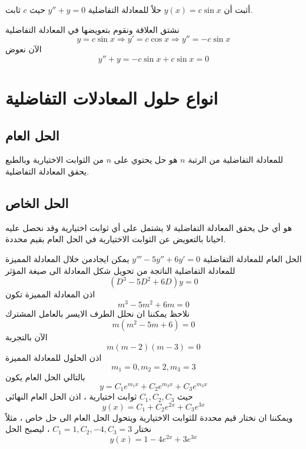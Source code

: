 \begin{nexample}
    أثبت أن $y(x)=c \sin x$ حلاً للمعادلة التفاضلية $y''+y=0$ حيث $c$ ثابت.
\end{nexample}
\begin{solution}
    نشتق العلاقة ونقوم بتعويضها في المعادلة التفاضلية
\[
y=c\sin x\Rightarrow y'=c\cos x\Rightarrow y''=-c\sin x
\]
الآن نعوض
\[
y''+y=-c\sin x+c\sin x=0
\]
\end{solution}

\section*{انواع حلول المعادلات التفاضلية \cite{diff_eqs_pt1}}
\subsection*{الحل العام}
 للمعادلة التفاضلية من الرتبة $n$ هو حل يحتوي على $n$ من الثوابت الاختيارية وبالطبع يحقق المعادلة التفاضلية.
\subsection*{الحل الخاص}
 هو أي حل يحقق المعادلة التفاضلية لا يشتمل على أي ثوابت اختيارية وقد نحصل عليه احيانا بالتعويض عن الثوابت الاختيارية في الحل العام بقيم محددة.
\newpage
\begin{nexample}
    الحل العام للمعادلة التفاضلية $y'''-5y''+6y'=0$ يمكن ايجادمن خلال المعادلة المميزة للمعادلة التفاضلية الناتجة من تحويل شكل المعادلة الى صيغة المؤثر
    \[
    (D^3 - 5D^2 + 6D) y = 0
    \]
    اذن المعادلة المميزة تكون
    \[
    m^3 - 5m^2 + 6m = 0
    \]
    نلاحظ يمكننا ان نحلل الطرف الايسر بالعامل المشترك
    \[
    m(m^2 - 5m + 6) = 0
    \]
    الآن بالتجربة
    \[
    m(m-2)(m-3) = 0
    \]
    اذن الحلول للمعادلة المميزة
    \[
    m_1 = 0 , m_2 = 2, m_3 = 3
    \]
    بالتالي الحل العام يكون
    \[
    y = C_1 e^{m_1x} + C_2 e^{m_2 x} + C_3 e^{m_3 x}
    \]
   حيث $C_1, C_2, C_3 $ ثوابت اختيارية ، اذن الحل العام النهائي
    \[
    y(x) = C_1 + C_2 e^{2x} + C_3 e^{3x}
    \]
     ويمكننا ان نختار قيم محددة للثوابت الاختيارية ويتحول الحل العام الى حل خاص ، مثلاً نختار 
     $C_1 = 1, C_2, -4, C_3 = 3$ ، ليصبح الحل
    \[
    y(x) = 1 -4e^{2x} + 3e^{3x}
    \]
\end{nexample}
